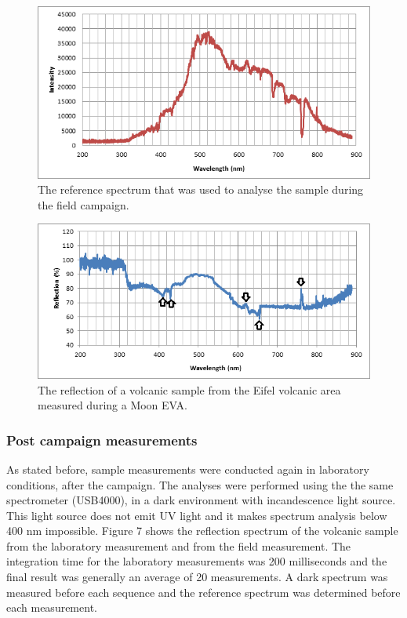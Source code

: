 \documentclass[preprint]{elsarticle}
\begin{document}
\begin{figure}
\centering
\includegraphics{img/figure05.png}
\caption{The reference spectrum that was used to analyse the sample during the field campaign.}
\end{figure}

\begin{figure}
\centering
\includegraphics{img/figure06.png}
\caption{The reflection of a volcanic sample from the Eifel volcanic area measured during a Moon EVA.}
\end{figure}

\subsubsection{Post campaign measurements}
As stated before, sample measurements were conducted again in laboratory conditions, after the campaign. The analyses were performed using the the same spectrometer (USB4000), in a dark environment with incandescence light source. This light source does not emit UV light and it makes spectrum analysis below 400 nm impossible. Figure 7 shows the reflection spectrum of the volcanic sample from the laboratory measurement and from the field measurement. The integration time for the laboratory measurements was 200 milliseconds and the final result was generally an average of 20 measurements. A dark spectrum was measured before each sequence and the reference spectrum was determined before each measurement.
\end{document}
